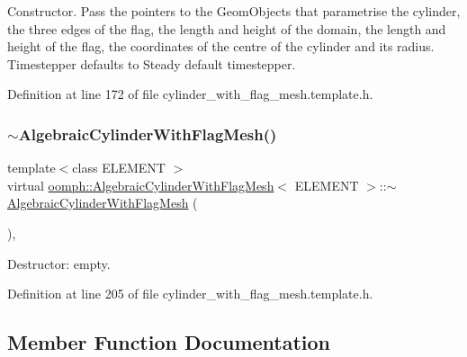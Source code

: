 Constructor. Pass the pointers to the Geom\+Objects that parametrise the cylinder, the three edges of the flag, the length and height of the domain, the length and height of the flag, the coordinates of the centre of the cylinder and its radius. Timestepper defaults to Steady default timestepper. 



Definition at line 172 of file cylinder\+\_\+with\+\_\+flag\+\_\+mesh.\+template.\+h.

\mbox{\label{classoomph_1_1AlgebraicCylinderWithFlagMesh_ac7e92a8dc3add0cd1f666dc8c9f8ca6f}} 
\subsubsection{\texorpdfstring{$\sim$\+Algebraic\+Cylinder\+With\+Flag\+Mesh()}{~AlgebraicCylinderWithFlagMesh()}}
{\footnotesize\ttfamily template$<$class E\+L\+E\+M\+E\+NT $>$ \\
virtual \hyperlink{classoomph_1_1AlgebraicCylinderWithFlagMesh}{oomph\+::\+Algebraic\+Cylinder\+With\+Flag\+Mesh}$<$ E\+L\+E\+M\+E\+NT $>$\+::$\sim$\hyperlink{classoomph_1_1AlgebraicCylinderWithFlagMesh}{Algebraic\+Cylinder\+With\+Flag\+Mesh} (\begin{DoxyParamCaption}{ }\end{DoxyParamCaption})\hspace{0.3cm}{\ttfamily [inline]}, {\ttfamily [virtual]}}



Destructor\+: empty. 



Definition at line 205 of file cylinder\+\_\+with\+\_\+flag\+\_\+mesh.\+template.\+h.



\subsection{Member Function Documentation}
\mbox{\label{classoomph_1_1AlgebraicCylinderWithFlagMesh_a5e1e770e82577e5702470d8b87f8599d}} 
